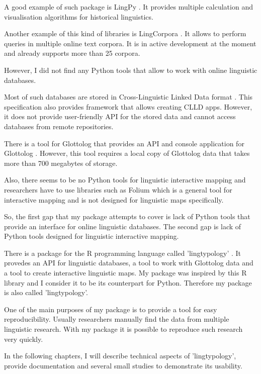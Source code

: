\documentclass[a4paper,12pt]{article}
\begin{document}
A good example of such package is LingPy \parencite{List2017i}. It provides multiple calculation and visualisation algorithms for historical linguistics.

Another example of this kind of libraries is LingCorpora \parencite{alexey}. It allows to perform queries in multiple online text corpora. It is in active development at the moment and already supports more than 25 corpora.

However, I did not find any Python tools that allow to work with online linguistic databases.

Most of such databases are stored in Cross-Linguistic Linked Data format \parencite{CLLD}. This specification also provides framework \parencite{RobertForkel2019} that allows creating CLLD apps. However, it does not provide user-friendly API for the stored data and cannot access databases from remote repositories.

There is a tool for Glottolog \parencite{HaraldHammarstrom2019} that provides an API and console application for Glottolog \parencite{Robert2Forkel2019}. However, this tool requires a local copy of Glottolog data that takes more than 700 megabytes of storage.

Also, there seems to be no Python tools for linguistic interactive mapping and researchers have to use libraries such as Folium \parencite{folium} which is a general tool for interactive mapping and is not designed for linguistic maps specifically.

So, the first gap that my package attempts to cover is lack of Python tools that provide an interface for online linguistic databases. The second gap is lack of Python tools designed for linguistic interactive mapping.

There is a package for the R programming language called 'lingtypology' \parencite{GeorgeMoroz2018}. It provedes an API for linguistic databases, a tool to work with Glottolog data and a tool to create interactive linguistic maps. My package was inspired by this R library and I consider it to be its counterpart for Python. Therefore my package is also called 'lingtypology'.

One of the main purposes of my package is to provide a tool for easy reproducibility. Usually researchers manually find the data from multiple linguistic research. With my package it is possible to reproduce such research very quickly.

In the following chapters, I will describe technical aspects of 'lingtypology', provide documentation and several small studies to demonstrate its usability.
\end{document}
